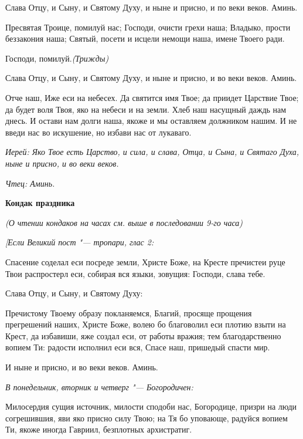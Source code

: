 \normalfont{}Слава Отцу, и Сыну, и Святому Духу, и ныне и присно, и по веки веков. Аминь.



Пресвятая Троице, помилуй нас; Господи, очисти грехи наша; Владыко, прости беззакония наша; Святый, посети и исцели немощи наша, имене Твоего ради.



Господи, помилуй.\itshape  (Трижды)

\normalfont{}Слава Отцу, и Сыну, и Святому Духу, и ныне и присно, и во веки веков. Аминь.

Отче наш, Иже еси на небесех. Да святится имя Твое; да приидет Царствие Твое; да будет воля Твоя, яко на небеси и на земли. Хлеб наш насущный даждь нам днесь. И остави нам долги наша, якоже и мы оставляем должником нашим. И не введи нас во искушение, но избави нас от лукаваго.

\itshape Иерей\normalfont{}: Яко Твое есть Царство, и сила, и слава, Отца, и Сына, и Святаго Духа, ныне и присно, и во веки веков.

\itshape Чтец\normalfont{}: Аминь.


\medskip
\bfseries Кондак праздника\normalfont{}

\itshape (О чтении кондаков на часах см. выше в последовании 9-го часа)\normalfont{}



\itshape [Если Великий пост "--- тропари, глас 2:\normalfont{}

Спасение соделал еси посреде земли, Христе Боже, на Кресте пречистеи руце Твои распростерл еси, собирая вся языки, зовущия: Господи, слава тебе.



Слава Отцу, и Сыну, и Святому Духу: 



Пречистому Твоему образу покланяемся, Благий, просяще прощения прегрешений наших, Христе Боже, волею бо благоволил еси плотию взыти на Крест, да избавиши, яже создал еси, от работы вражия; тем благодарственно вопием Ти: радости исполнил еси вся, Спасе наш, пришедый спасти мир.



И ныне и присно, и во веки веков. Аминь.

\itshape В понедельник, вторник и четверг "--- Богородичен:

\normalfont{}Милосердия сущия источник, милости сподоби нас, Богородице, призри на люди согрешившия, яви яко присно силу Твою; на Тя бо уповающе, радуйся вопием Ти, якоже иногда Гавриил, безплотных архистратиг.

